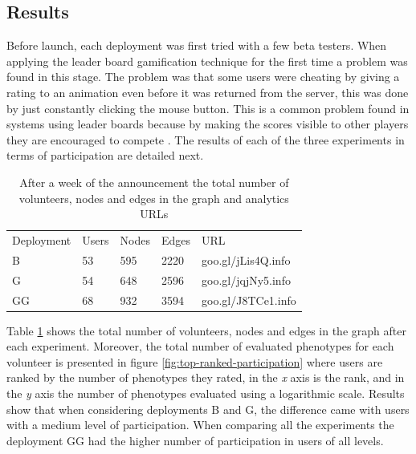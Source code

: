 \subsection{Results} 
Before launch, each deployment was first tried with a few beta testers. 
When applying the leader board gamification technique for the first time a 
problem was found in this stage. The problem was that some users were cheating by giving a
rating to an animation even before it was returned from the server, this was done by just
constantly clicking the mouse button. This is a common problem found in systems using leader
boards because by making the scores visible to other players they are encouraged 
to compete \cite{hickman2010total}. The results of each of the three experiments in 
terms of participation are detailed next.

\begin{table}
  \small
  \caption{ After a week of the announcement the total number of volunteers, 
  nodes and edges in the graph and analytics URLs}
  \label{tab:urls} 
  \centering
  \small
  \begin{tabular}{l l l l l}
    \hline\noalign{\smallskip}
     Deployment &  Users &  Nodes &  Edges & URL \\
    \noalign{\smallskip}\hline\noalign{\smallskip}
    B   & 53 &  595   & 2220  & goo.gl/jLis4Q.info \\ \hline
    G   & 54 &  648   & 2596  & goo.gl/jqjNy5.info \\ \hline
    GG  & 68 &  932   & 3594  & goo.gl/J8TCe1.info \\ \hline
    \end{tabular}
\end{table}

Table \ref{tab:urls} shows the total number of volunteers, nodes and edges 
in the graph after each experiment. Moreover, the total number of evaluated 
phenotypes for each volunteer is presented in figure 
\ref{fig:top-ranked-participation} where users are ranked by the 
number of phenotypes they rated, in the \emph{x} axis is the rank, and in the \emph{y} axis 
the number of phenotypes evaluated using a logarithmic scale. Results show that when 
considering deployments B and G, the difference came with users with a medium level of participation.
When comparing all the experiments the deployment GG had the higher number of participation in users of all levels.    

